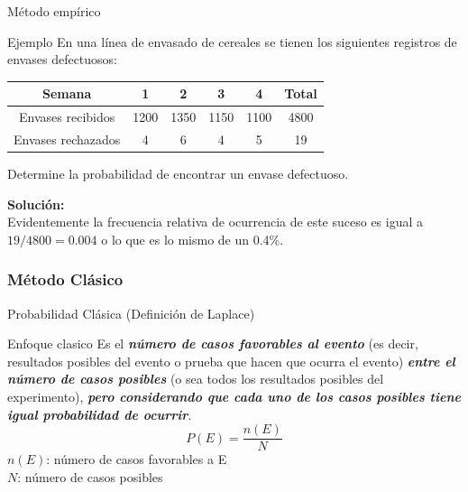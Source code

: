 \documentclass[11pt]{beamer}
\begin{document}
           \begin{frame}{Método empírico}
               \begin{block}{Ejemplo}
                   En una línea de envasado de cereales se tienen los siguientes registros de envases defectuosos:
                   \begin{table}[!h]
                       \centering
                       \begin{tabular}{|c|c|c|c|c|c|}
                           \hline
                           Semana & 1 & 2 & 3 & 4 & Total\\
                           \hline
                           Envases recibidos  & 1200 & 1350 & 1150 & 1100 & 4800\\
                           Envases rechazados & 4    & 6    & 4    & 5    & 19\\
                           \hline
                       \end{tabular}
                   \end{table}
                   Determine la probabilidad de encontrar un envase defectuoso.
               \end{block}
               \pause
               \textbf{Solución:}\\
               Evidentemente la frecuencia relativa de ocurrencia de este suceso es igual a $19/4800 = 0.004$ o lo que es lo mismo de un 0.4\%.
           \end{frame}



        \subsubsection*{Método Clásico}


          \begin{frame}{Probabilidad Clásica (Definición de Laplace)}
            \begin{block}{Enfoque clasico}
               Es el \textbf{\textit{número de casos favorables al evento}} (es decir, resultados posibles del evento o prueba que hacen que ocurra el evento) \textit{\textbf{entre el número de casos posibles}} (o sea todos los resultados posibles del experimento), \textit{\textbf{pero considerando que cada uno de los casos posibles tiene igual probabilidad de ocurrir}}.
               $$P(E) = \dfrac{n(E)}{N}$$
               $n(E)$: número de casos favorables a E\\
               $N$: número de casos posibles
            \end{block}
          \end{frame}
\end{document}
